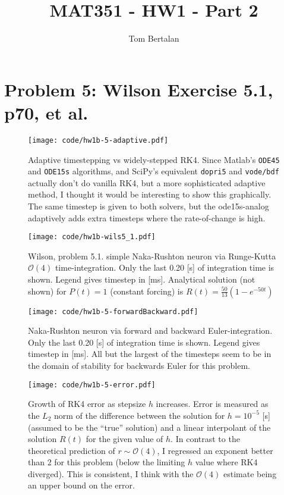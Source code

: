 \documentclass{tufte-handout}
\title{MAT351 - HW1 - Part 2}
\author{Tom Bertalan}
\begin{document}
\maketitle
\tableofcontents

\newpage
\section{Problem 5: Wilson Exercise 5.1, p70, et al.}
\begin{figure}[ht]
 \texttt{[image: code/hw1b-5-adaptive.pdf]}
 \caption{Adaptive timestepping vs widely-stepped RK4. Since Matlab's 
\texttt{ODE45} and \texttt{ODE15s} algorithms, and SciPy's equivalent
\texttt{dopri5} and \texttt{vode/bdf} actually don't do 
vanilla RK4, but a more sophisticated adaptive method, I thought it would be 
interesting to show this graphically. The same timestep is given to both 
solvers, but the ode15s-analog adaptively adds extra timesteps where the 
rate-of-change is high.\label{fig:adaptive}}
\end{figure}
\begin{figure}[ht]
 \texttt{[image: code/hw1b-wils5\_1.pdf]}
 \caption{Wilson, problem 5.1. simple Naka-Rushton neuron via Runge-Kutta 
$\mathcal O(4)$ time-integration.
Only the last 0.20 [s] of integration time is shown.
Legend gives timestep in [ms].
Analytical solution (not shown) for $P(t)=1$ (constant forcing) is $R(t) = 
\frac{50}{13}(1 - e^{-50t})$
\label{fig:wils}}
\end{figure}
\begin{figure}[ht]
 \texttt{[image: code/hw1b-5-forwardBackward.pdf]}
 \caption{Naka-Rushton neuron via forward and backward Euler-integration.
Only the last 0.20 [s] of integration time is shown.
Legend gives timestep in [ms]. All but the largest of the timesteps seem to be 
in the domain of stability for backwards Euler for this problem.
\label{fig:fb}}
\end{figure}
\begin{figure}[ht]
 \texttt{[image: code/hw1b-5-error.pdf]}
 \caption{Growth of RK4 error as stepsize $h$ increases. Error is measured as 
the $L_2$ norm of the difference between the solution for $h=10^{-5}$ [s] 
(assumed to be the ``true'' solution) and a linear interpolant of the 
solution $R(t)$ for the given value of $h$. In contrast to the theoretical 
prediction of $r\sim\mathcal O(4)$, I regressed an exponent better than 2 for 
this problem (below the limiting $h$ value where RK4 diverged). This is 
consistent, I think with the $\mathcal O(4)$ estimate being an upper bound on 
the error.
\label{fig:fb}}
\end{figure}
\newpage
\end{document}
